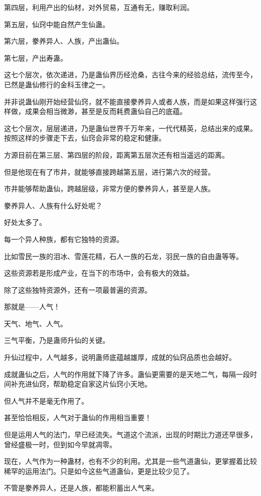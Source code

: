 \begin{this_body}
第四层，利用产出的仙材，对外贸易，互通有无，赚取利润。

第五层，仙窍中能自然产生仙蛊。

第六层，豢养异人、人族，产出蛊仙。

第七层，产出寿蛊。

这七个层次，依次递进，乃是蛊仙界历经沧桑，古往今来的经验总结，流传至今，已然是蛊仙修行的金科玉律之一。

并非说蛊仙刚开始经营仙窍，就不能直接豢养异人或者人族，而是如果这样强行这样做，成果会相当微渺，甚至是反而耗费蛊仙自己的底蕴。

这七个层次，层层递进，乃是蛊仙世界千万年来，一代代精英，总结出来的成果。按照这样的步骤走下去，仙窍会非常的稳定和健康。

方源目前在第三层、第四层的阶段，距离第五层次还有相当遥远的距离。

但是他现在有了市井，就能够直接跨越第五层，进行第六次的经营。

市井能够帮助蛊仙，跨越层级，非常方便的豢养异人，甚至是人族。

豢养异人、人族有什么好处呢？

好处太多了。

每一个异人种族，都有它独特的资源。

比如雪民一族的泪冰、雪莲花精，石人一族的石龙，羽民一族的自由蛊等等。

这些资源若是形成产业，在当下的市场中，会有极大的效益。

除了这些独特资源外，还有一项最普遍的资源。

那就是——人气！

天气、地气、人气。

三气平衡，乃是蛊师升仙的关键。

升仙过程中，人气越多，说明蛊师底蕴越雄厚，成就的仙窍品质也会越好。

成就蛊仙之后，人气的作用就下降了许多。蛊仙更需要的是天地二气，每隔一段时间补充进仙窍，帮助稳定自家这片仙窍小天地。

但人气并不是毫无作用了。

甚至恰恰相反，人气对于蛊仙的作用相当重要！

但是运用人气的法门，早已经流失。气道这个流派，出现的时期比力道还早很多，曾经盛极一时，但到如今早就凋零。

现在，人气作为一种蛊材，也有不少的利用。尤其是一些气道蛊仙，更掌握着比较稀罕的运用法门。只是如今这些气道蛊仙，更是比较少见了。

不管是豢养异人，还是人族，都能积蓄出人气来。


\end{this_body}
